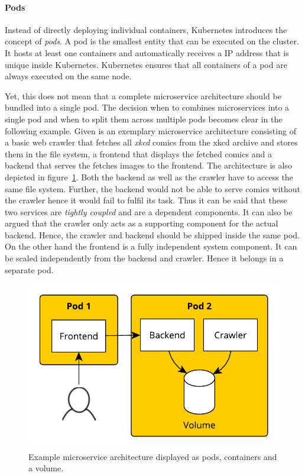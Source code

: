 \paragraph{Pods}%
\label{par:Pods}
Instead of directly deploying individual containers, Kubernetes introduces the
concept of \textit{pods}. A pod is the smallest entity that can be executed on
the cluster. It hosts at least one containers and automatically receives a
\ac{IP} address that is unique inside Kubernetes. Kubernetes ensures that all
containers of a pod are always executed on the same node.

Yet, this does not mean that a complete microservice architecture should be
bundled into a single pod. The decision when to combines microservices into a
single pod and when to split them across multiple pods becomes clear in the
following example. Given is an exemplary microservice architecture consisting
of a basic web crawler that fetches all \textit{xkcd} comics from the xkcd
archive and stores them in the file system, a frontend that displays the
fetched comics and a backend that serves the fetches images to the frontend.
The architecture is also depicted in figure~\ref{fig:pods_example}. Both the
backend as well as the crawler have to access the same file system. Further,
the backend would not be able to serve comics without the crawler hence it
would fail to fulfil its task. Thus it can be said that these two services are
\textit{tightly coupled} and are a dependent components. It can also be argued
that the crawler only acts as a supporting component for the actual backend.
Hence, the crawler and backend should be shipped inside the same pod. On the
other hand the frontend is a fully independent system component. It can be
scaled independently from the backend and crawler. Hence it belongs in a
separate pod. 

\begin{figure}[H]
\begin{center}
  \includegraphics[scale=0.7]{images/figures/pod_example.pdf}
\end{center}
\caption{Example microservice architecture displayed as pods, containers and a volume.}%
\label{fig:pods_example}
\end{figure}

